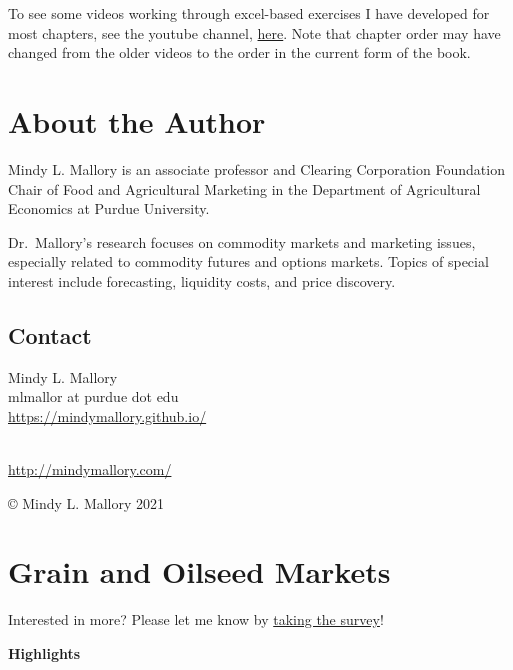 \documentclass[
  letterpaper,
  DIV=11,
  numbers=noendperiod]{scrreprt}
\begin{document}
To see some videos working through excel-based exercises I have
developed for most chapters, see the youtube channel,
\href{https://www.youtube.com/@uiucace4277/videos}{here}. Note that
chapter order may have changed from the older videos to the order in the
current form of the book.


\hypertarget{about-the-author}{%
\chapter*{About the Author}\label{about-the-author}}


Mindy L. Mallory is an associate professor and Clearing Corporation
Foundation Chair of Food and Agricultural Marketing in the Department of
Agricultural Economics at Purdue University.

Dr.~Mallory's research focuses on commodity markets and marketing
issues, especially related to commodity futures and options markets.
Topics of special interest include forecasting, liquidity costs, and
price discovery.

\hypertarget{contact}{%
\section*{Contact}\label{contact}}


Mindy L. Mallory\\
mlmallor at purdue dot edu\\
\url{https://mindymallory.github.io/}\strut \\
\url{http://mindymallory.com/}

© Mindy L. Mallory 2021


\hypertarget{grain-and-oilseed-markets}{%
\chapter{Grain and Oilseed Markets}\label{grain-and-oilseed-markets}}

{Interested in more? Please let me know by}
\href{https://forms.gle/Q3VByCQZHjfQSy9D7}{taking the survey}!

\textbf{Highlights}
\end{document}
